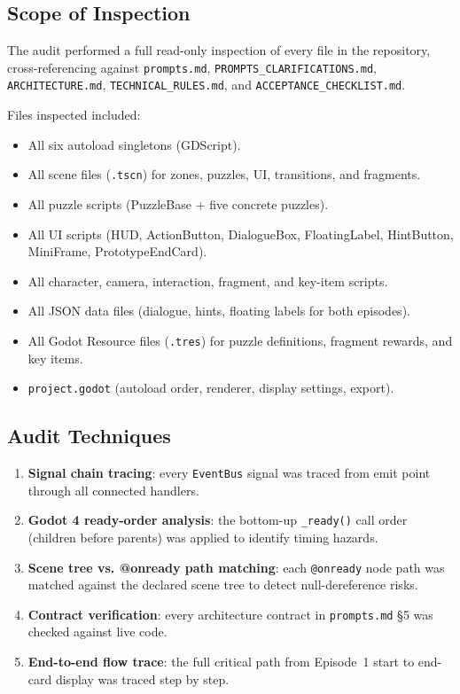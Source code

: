 \documentclass[12pt, a4paper]{article}
\begin{document}
\subsection{Scope of Inspection}

The audit performed a full read-only inspection of every file in the
repository, cross-referencing against \texttt{prompts.md},
\texttt{PROMPTS\_CLARIFICATIONS.md}, \texttt{ARCHITECTURE.md},
\texttt{TECHNICAL\_RULES.md}, and \texttt{ACCEPTANCE\_CHECKLIST.md}.

Files inspected included:
\begin{itemize}[nosep]
  \item All six autoload singletons (GDScript).
  \item All scene files (\texttt{.tscn}) for zones, puzzles, UI, transitions, and fragments.
  \item All puzzle scripts (PuzzleBase + five concrete puzzles).
  \item All UI scripts (HUD, ActionButton, DialogueBox, FloatingLabel, HintButton, MiniFrame, PrototypeEndCard).
  \item All character, camera, interaction, fragment, and key-item scripts.
  \item All JSON data files (dialogue, hints, floating labels for both episodes).
  \item All Godot Resource files (\texttt{.tres}) for puzzle definitions, fragment rewards, and key items.
  \item \texttt{project.godot} (autoload order, renderer, display settings, export).
\end{itemize}

\subsection{Audit Techniques}

\begin{enumerate}
  \item \textbf{Signal chain tracing}: every \texttt{EventBus} signal was traced
        from emit point through all connected handlers.
  \item \textbf{Godot 4 ready-order analysis}: the bottom-up \texttt{\_ready()}
        call order (children before parents) was applied to identify timing hazards.
  \item \textbf{Scene tree vs. @onready path matching}: each \texttt{@onready} node
        path was matched against the declared scene tree to detect null-dereference risks.
  \item \textbf{Contract verification}: every architecture contract in
        \texttt{prompts.md} §5 was checked against live code.
  \item \textbf{End-to-end flow trace}: the full critical path from Episode~1
        start to end-card display was traced step by step.
\end{enumerate}
\end{document}
